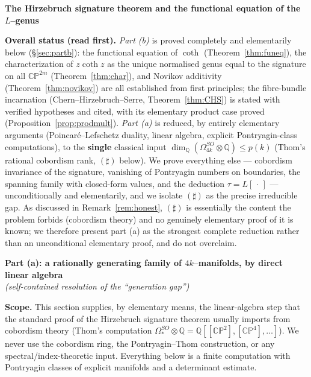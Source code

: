 \documentclass[12pt]{article}
\theoremstyle{definition}
\begin{document}
\begin{center}
\textbf{\Large The Hirzebruch signature theorem and the functional equation of the
$L$--genus}
\end{center}

\noindent\textbf{Overall status (read first).}
\emph{Part (b)} is proved completely and elementarily below
(\S\ref{sec:partb}): the functional equation of $\coth$ (Theorem~\ref{thm:funeq}), the
characterization of $z\coth z$ as the unique normalised genus equal to the signature on
all $\mathbb{CP}^{2m}$ (Theorem~\ref{thm:char}), and Novikov additivity
(Theorem~\ref{thm:novikov}) are all established from first principles; the
fibre-bundle incarnation (Chern--Hirzebruch--Serre, Theorem~\ref{thm:CHS}) is stated with
verified hypotheses and cited, with its elementary product case proved
(Proposition~\ref{prop:prodmult}). \emph{Part (a)} is reduced, by entirely elementary
arguments (Poincar\'e--Lefschetz duality, linear algebra, explicit Pontryagin-class
computations), to the \textbf{single} classical input
$\dim_{\mathbb Q}(\Omega^{SO}_{4k}\otimes\mathbb Q)\le p(k)$ (Thom's rational cobordism
rank, $(\sharp)$ below). We prove everything else --- cobordism invariance of the
signature, vanishing of Pontryagin numbers on boundaries, the spanning family with
closed-form values, and the deduction $\tau=L[\,\cdot\,]$ --- unconditionally and
elementarily, and we isolate $(\sharp)$ as the precise irreducible gap. As discussed in
Remark~\ref{rem:honest}, $(\sharp)$ is essentially the content the problem forbids
(cobordism theory) and no genuinely elementary proof of it is known; we therefore
present part (a) as the strongest complete reduction rather than an unconditional
elementary proof, and do not overclaim.

\bigskip

\begin{center}
\textbf{\large Part (a): a rationally generating family of $4k$--manifolds, by direct
linear algebra}\\[2pt]
\textit{(self-contained resolution of the ``generation gap'')}
\end{center}


\bigskip

\noindent
\textbf{Scope.}
This section supplies, by elementary means, the linear-algebra step that the standard
proof of the Hirzebruch signature theorem usually imports from cobordism theory
(Thom's computation $\Omega^{SO}_\ast\otimes\mathbb{Q}=
\mathbb{Q}[[\mathbb{CP}^2],[\mathbb{CP}^4],\dots]$).  We never use the cobordism ring,
the Pontryagin--Thom construction, or any spectral/index-theoretic input.  Everything
below is a finite computation with Pontryagin classes of explicit manifolds and a
determinant estimate.
\end{document}
